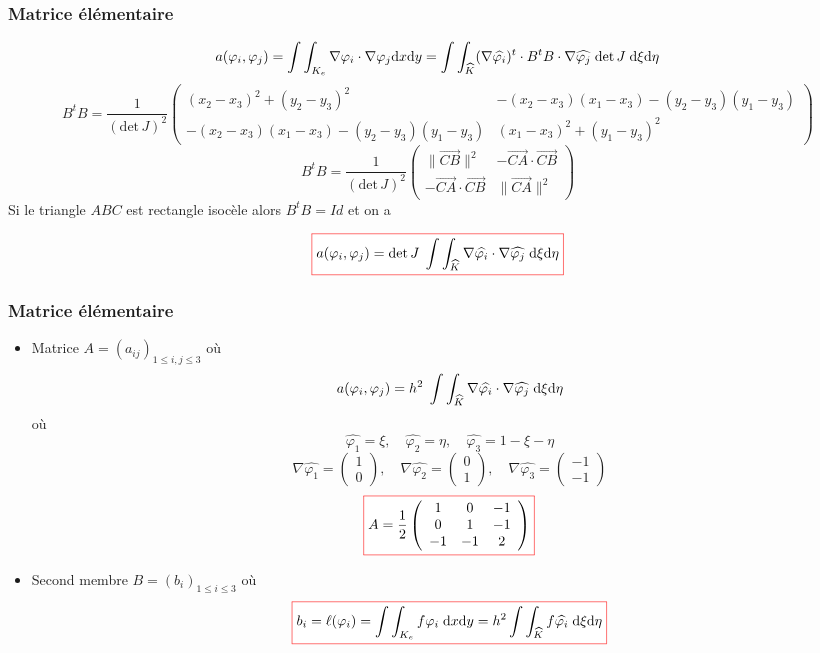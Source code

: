 \documentclass{beamer}
\def \de {{\rm d}}
\newcommand{\myredbox}[1]{\fcolorbox{red}{white}{$\displaystyle#1$}}
\begin{document}
\begin{frame}
\frametitle{Matrice élémentaire}
\[a(\varphi_i,\varphi_j)=\displaystyle \int\int_{K_e}\nabla \varphi_i\cdot \nabla \varphi_j \de x\de y=\displaystyle \int\int_{\widehat{K}}(\nabla \widehat{\varphi_i})^t\cdot B^tB\cdot \nabla \widehat{\varphi_j}\;\mbox{det}\,  J\;\de\xi\de\eta\] 
{\tiny
\[B^tB=\frac{1}{\left(\mbox{det}\,  J\right)^2}\left(\begin{array}{cc}
(x_2-x_3)^2+(y_2-y_3)^2   &-(x_2-x_3)(x_1-x_3)-(y_2-y_3)(y_1-y_3)  \\
-(x_2-x_3)(x_1-x_3)-(y_2-y_3)(y_1-y_3) & (x_1-x_3)^2+(y_1-y_3)^2
\end{array}\right)\]
}
\[B^tB=\frac{1}{\left(\mbox{det}\,  J\right)^2}\left(\begin{array}{cc}
\|\overrightarrow{CB}\|^2   &-\overrightarrow{CA}\cdot \overrightarrow{CB} \\
-\overrightarrow{CA}\cdot \overrightarrow{CB} & \|\overrightarrow{CA}\|^2
\end{array}\right)\]
Si le triangle $ABC$ est rectangle isocèle alors $B^tB=Id$ et on a

\[\myredbox{a(\varphi_i,\varphi_j)=\displaystyle \mbox{det}\,  J\; \int\int_{\widehat{K}}\nabla \widehat{\varphi_i} \cdot \nabla \widehat{\varphi_j}\;\de\xi\de\eta}\] 
\end{frame}


\begin{frame}
\frametitle{Matrice élémentaire}
\begin{itemize}
\item Matrice $A=(a_{ij})_{1\leq i,j \leq 3}$ où 
\[a(\varphi_i,\varphi_j)=\displaystyle h^2\; \int\int_{\widehat{K}}\nabla \widehat{\varphi_i} \cdot \nabla \widehat{\varphi_j}\;\de\xi\de\eta\]
où
\[\widehat{\varphi_1}=\xi,\quad \widehat{\varphi_2}=\eta,\quad \widehat{\varphi_3}=1-\xi-\eta\] 
\[\nabla\widehat{\varphi_1}=\left(\begin{array}{c} 1\\0\end{array}\right)
 ,\quad \nabla\widehat{\varphi_2}=\left(\begin{array}{c} 0\\1\end{array}\right),\quad \nabla\widehat{\varphi_3}=\left(\begin{array}{c} -1\\-1\end{array}\right)\] 
 \[\myredbox{A=\frac 12 \left(\begin{array}{ccc} 1&0&-1\\0&1&-1\\-1&-1&2\end{array}\right)}\]
 \item Second membre $B=(b_i)_{1\leq i\leq 3}$ où
 \[\myredbox{b_{i} = \ell(\varphi_i)=\displaystyle \int\int_{K_e} f \varphi_i \;\de x\de y =h^2\displaystyle \int\int_{\widehat{K}} f \widehat{\varphi_i} \;\de\xi\de\eta}\] 
\end{itemize}
\end{frame}
\end{document}
